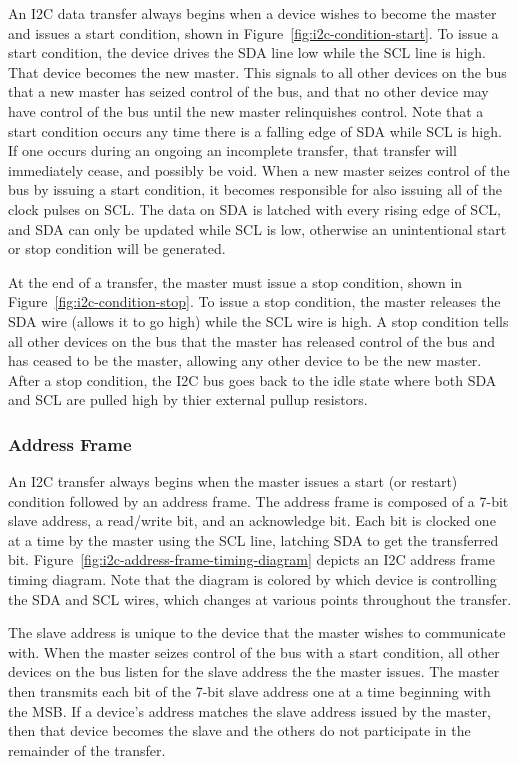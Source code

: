 An I2C data transfer always begins when a device wishes to become the master and issues a start condition, shown in Figure~\ref{fig:i2c-condition-start}. To issue a start condition, the device drives the SDA line low while the SCL line is high. That device becomes the new master. This signals to all other devices on the bus that a new master has seized control of the bus, and that no other device may have control of the bus until the new master relinquishes control. Note that a start condition occurs any time there is a falling edge of SDA while SCL is high. If one occurs during an ongoing an incomplete transfer, that transfer will immediately cease, and possibly be void. When a new master seizes control of the bus by issuing a start condition, it becomes responsible for also issuing all of the clock pulses on SCL. The data on SDA is latched with every rising edge of SCL, and SDA can only be updated while SCL is low, otherwise an unintentional start or stop condition will be generated.

At the end of a transfer, the master must issue a stop condition, shown in Figure~\ref{fig:i2c-condition-stop}. To issue a stop condition, the master releases the SDA wire (allows it to go high) while the SCL wire is high. A stop condition tells all other devices on the bus that the master has released control of the bus and has ceased to be the master, allowing any other device to be the new master. After a stop condition, the I2C bus goes back to the idle state where both SDA and SCL are pulled high by thier external pullup resistors.

\subsubsection{Address Frame}

An I2C transfer always begins when the master issues a start (or restart) condition followed by an address frame. The address frame is composed of a 7-bit slave address, a read/write bit, and an acknowledge bit. Each bit is clocked one at a time by the master using the SCL line, latching SDA to get the transferred bit. Figure~\ref{fig:i2c-address-frame-timing-diagram} depicts an I2C address frame timing diagram. Note that the diagram is colored by which device is controlling the SDA and SCL wires, which changes at various points throughout the transfer.

The slave address is unique to the device that the master wishes to communicate with. When the master seizes control of the bus with a start condition, all other devices on the bus listen for the slave address the the master issues. The master then transmits each bit of the 7-bit slave address one at a time beginning with the MSB. If a device's address matches the slave address issued by the master, then that device becomes the slave and the others do not participate in the remainder of the transfer.


